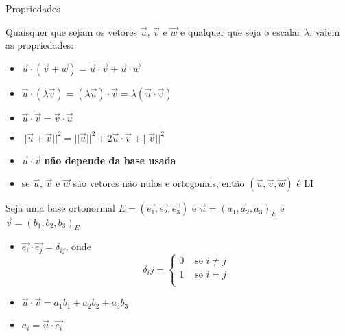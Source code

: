 \begin{frame}{Propriedades}

    Quaisquer que sejam os vetores \(\vec{u}\), \(\vec{v}\) e \(\vec{w}\) e qualquer que seja o escalar \(\lambda\), valem as propriedades:
    \begin{itemize}
        \item \(\vec{u}\cdot (\vec{v}+\vec{w})=\vec{u}\cdot\vec{v}+\vec{u}\cdot\vec{w}\)
        \item \(\vec{u}\cdot (\lambda\vec{v})=(\lambda\vec{u})\cdot\vec{v}=\lambda (\vec{u}\cdot\vec{v})\)
        \item \(\vec{u}\cdot\vec{v}=\vec{v}\cdot\vec{u}\)
        \item \(||\vec{u}+\vec{v}||^2=||\vec{u}||^2+2\vec{u}\cdot\vec{v}+||\vec{v}||^2\)
        \item \(\vec{u}\cdot\vec{v}\) \textbf{não depende da base usada}
        \item se \(\vec{u}\), \(\vec{v}\) e \(\vec{w}\) são vetores não nulos e ortogonais, então \((\vec{u},\vec{v},\vec{w})\) é LI

    \end{itemize}

\end{frame}

\begin{frame}{}
    Seja uma base ortonormal \(E=(\vec{e_1},\vec{e_2},\vec{e_3})\) e \(\vec{u}=(a_1,a_2,a_3)_E\) e \(\vec{v}=(b_1,b_2,b_3)_E\)
    \begin{itemize}
        \item \(\vec{e_i}\cdot\vec{e_j}=\delta_{ij}\), onde
            \[
                \delta_ij=%
                \begin{cases}
                    0 &\text{ se } i \neq j \\
                    1 &\text{ se } i = j\\
                \end{cases}
            \]
        \item \(\vec{u}\cdot\vec{v}=a_1 b_1 +a_2 b_2 + a_3 b_3\)
        \item \(a_i = \vec{u}\cdot\vec{e_i}\)
    \end{itemize}

\end{frame}


